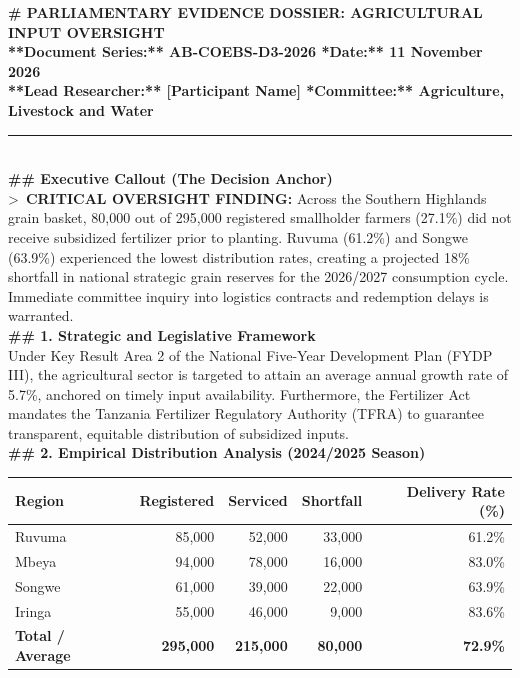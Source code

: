 \documentclass[11pt, a4paper]{report}
\begin{document}
\begin{tcolorbox}[colback=lightgrey, colframe=bordergrey, title=\textbf{Deliverable 3 Preview: \texttt{Day3\_Sector\_Evidence\_Dossier.md}}]
\small
\textbf{\# PARLIAMENTARY EVIDENCE DOSSIER: AGRICULTURAL INPUT OVERSIGHT}\\
\textbf{**Document Series:** AB-COEBS-D3-2026 \quad \textbar{} \quad **Date:** 11 November 2026}\\
\textbf{**Lead Researcher:** [Participant Name] \quad \textbar{} \quad **Committee:** Agriculture, Livestock and Water}\\[0.2cm]
\rule{\textwidth}{0.4pt}\\[0.2cm]
\textbf{\#\# Executive Callout (The Decision Anchor)}\\
\textgreater\ \textbf{CRITICAL OVERSIGHT FINDING:} Across the Southern Highlands grain basket, 80,000 out of 295,000 registered smallholder farmers (27.1\%) did not receive subsidized fertilizer prior to planting. Ruvuma (61.2\%) and Songwe (63.9\%) experienced the lowest distribution rates, creating a projected 18\% shortfall in national strategic grain reserves for the 2026/2027 consumption cycle. Immediate committee inquiry into logistics contracts and redemption delays is warranted.\\[0.2cm]
\textbf{\#\# 1. Strategic and Legislative Framework}\\
Under Key Result Area 2 of the National Five-Year Development Plan (FYDP III), the agricultural sector is targeted to attain an average annual growth rate of 5.7\%, anchored on timely input availability. Furthermore, the Fertilizer Act mandates the Tanzania Fertilizer Regulatory Authority (TFRA) to guarantee transparent, equitable distribution of subsidized inputs.\\[0.2cm]
\textbf{\#\# 2. Empirical Distribution Analysis (2024/2025 Season)}\\
\begin{tabular}{lrrrr}
\toprule
\textbf{Region} & \textbf{Registered} & \textbf{Serviced} & \textbf{Shortfall} & \textbf{Delivery Rate (\%)} \\
\midrule
Ruvuma & 85,000 & 52,000 & 33,000 & 61.2\% \\
Mbeya & 94,000 & 78,000 & 16,000 & 83.0\% \\
Songwe & 61,000 & 39,000 & 22,000 & 63.9\% \\
Iringa & 55,000 & 46,000 & 9,000 & 83.6\% \\
\midrule
\textbf{Total / Average} & \textbf{295,000} & \textbf{215,000} & \textbf{80,000} & \textbf{72.9\%} \\

\end{tabular}
\end{tcolorbox}
\end{document}
